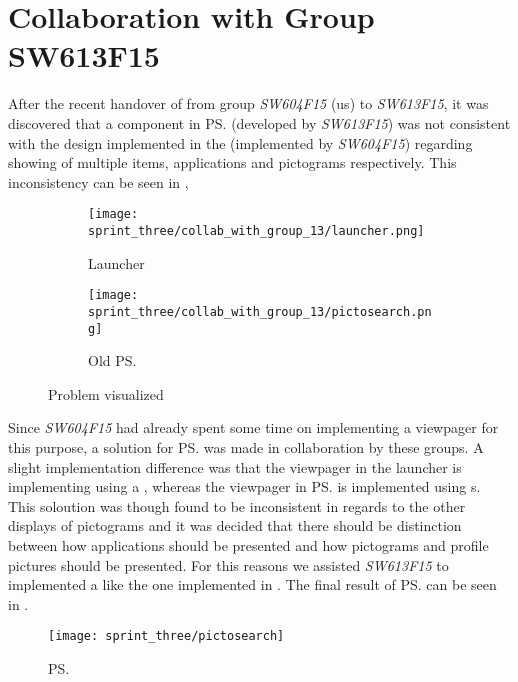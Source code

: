 
\section{Collaboration with Group SW613F15}
\label{sec:collaboration_with_group_sw613f15}

After the recent handover of \gc from group \emph{SW604F15} (us) to \emph{SW613F15}, it was discovered that a component in \ps (developed by \emph{SW613F15}) was not consistent with the design implemented in the \launcher (implemented by \emph{SW604F15}) regarding showing of multiple items, applications and pictograms respectively. This inconsistency can be seen in , 

\begin{figure}[!htbp]
    \centering

    \begin{subfigure}[t]{0.47\textwidth}
        \texttt{[image: sprint\_three/collab\_with\_group\_13/launcher.png]}
        \caption{Launcher}
        \label{fig:collab_with_group_13_launhcer}
    \end{subfigure}
    \hfill
    \begin{subfigure}[t]{0.47\textwidth}
        \texttt{[image: sprint\_three/collab\_with\_group\_13/pictosearch.png]}
        \caption{Old \ps}
        \label{fig:collab_with_group_13_pictosearch}
    \end{subfigure}
    
    \caption{Problem visualized}
    \label{fig:collab_with_group_13}
\end{figure}

Since \emph{SW604F15} had already spent some time on implementing a viewpager for this purpose, a solution for \ps was made in collaboration by these groups. A slight implementation difference was that the viewpager in the launcher is implementing using a , whereas the viewpager in \ps is implemented using s. This soloution was though found to be inconsistent in regards to the other displays of pictograms and it was decided that there should be distinction between how applications should be presented and how pictograms and profile pictures should be presented. For this reasons we assisted \emph{SW613F15} to implemented a  like the one implemented in \ct. The final result of \ps can be seen in .


\begin{figure}[!htbp]
    \centering
    \texttt{[image: sprint\_three/pictosearch]}
    \caption{\ps}
    \label{fig:pictosearch}
\end{figure}